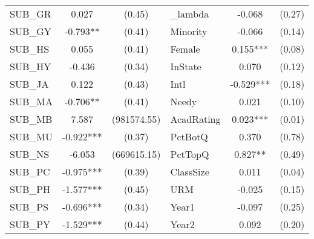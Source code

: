 \begin{table}[H]
\begin{threeparttable}
\begin{tabular}{l c c|l c c }
    SUB\_GR                                      & 0.027                      & (0.45)               & \_lambda            & -0.068                 & (0.27)               \\
    SUB\_GY                                      & -0.793**                   & (0.41)               & Minority            & -0.066                 & (0.14)               \\
    SUB\_HS                                      & 0.055                      & (0.41)               & Female              & 0.155***               & (0.08)               \\
    SUB\_HY                                      & -0.436                     & (0.34)               & InState             & 0.070                  & (0.12)               \\
    SUB\_JA                                      & 0.122                      & (0.43)               & Intl                & -0.529***              & (0.18)               \\
    SUB\_MA                                      & -0.706**                   & (0.41)               & Needy               & 0.021                  & (0.10)               \\
    SUB\_MB                                      & 7.587                      & (981574.55)          & AcadRating          & 0.023***               & (0.01)               \\
    SUB\_MU                                      & -0.922***                  & (0.37)               & PctBotQ             & 0.370                  & (0.78)               \\
    SUB\_NS                                      & -6.053                     & (669615.15)          & PctTopQ             & 0.827**                & (0.49)               \\
    SUB\_PC                                      & -0.975***                  & (0.39)               & ClassSize           & 0.011                  & (0.04)               \\
    SUB\_PH                                      & -1.577***                  & (0.45)               & URM                 & -0.025                 & (0.15)               \\
    SUB\_PS                                      & -0.696***                  & (0.34)               & Year1               & -0.097                 & (0.25)               \\
    SUB\_PY                                      & -1.529***                  & (0.44)               & Year2               & 0.092                  & (0.20)               \\

\end{tabular}
\end{threeparttable}
\end{table}
